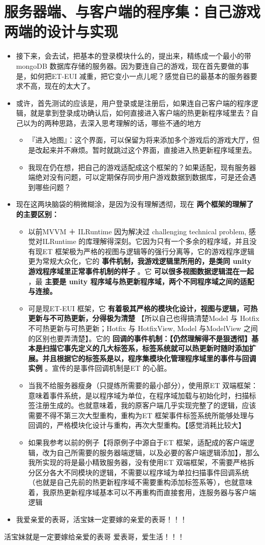 \documentclass[9pt, b5paper]{article}
\begin{document}
\section{服务器端、与客户端的程序集：自己游戏两端的设计与实现}
\label{sec-10}
\begin{itemize}
\item 接下来，会去试，把基本的登录模块什么的，提出来，精练成一个最小的带 mongoDB 数据库存储的服务器。因为要连自己的游戏，现在首先要做的事是，如何把ET-EUI 减重，把它变小一点儿呢？感觉自已的最基本的服务器要求不高，现在的太大了。
\item 或许，首先测试的应该是，用户登录或是注册后，如果连自己客户端的程序逻辑，就是拿到登录成功确认后，如何直接进入客户端的热更新程序域里去？自己以为的两种思路，去深入思考理解的话，哪些不通的地方
\begin{itemize}
\item 『进入地图』：这个界面，可以保留为将来添加多个游戏后的游戏大厅，但是改起来并不麻烦。暂时就跳过这个界面，直接进入热更新程序域里去。
\item 我现在仍在想，把自己的游戏适配成这个框架的？如果适配，现有服务器端绝对没有问题，可以定期保存同步用户游戏数据到数据库，可是还会遇到哪些问题？
\end{itemize}
\item 现在这两块脑袋的稍微糊涂，是因为没有理解透彻，现在 \textbf{两个框架的理解了的主要区别：}
\begin{itemize}
\item 以前MVVM ＋ ILRuntime 因为解决过 challenging technical problem, 感觉对ILRuntime 的库理解得深刻。它因为只有一个多余的程序域，并且没有现ET 框架极为严格的视图与逻辑等的强行分离等，它的游戏程序逻辑更为常规大众化，它的 \textbf{事件机制，我游戏逻辑里所用的，是类同 unity 游戏程序域里正常事件机制的样子} 。它 \textbf{可以很多视图数据逻辑混在一起} ，最 \textbf{主要是 unity 程序域与热更新程序域，两个不同程序域之间的适配与连接。}
\item 可是现ET-EUI 框架，它 \textbf{有着极其严格的模块化设计，视图与逻辑，可热更新与不可热更新，分得极为清楚} 【所以自己也得搞清楚Model 与 Hotfix 不可热更新与可热更新；Hotfix 与 HotfixView, Model 与ModelView 之间的区别也要弄清楚】。它的 \textbf{回调的事件机制：【仍然理解得不是狠透彻】基本是扫描它事先定义的几大标签系，标签系统就可以热更新时随时添加扩展。并且根据它的标签系是以，程序集模块化管理程序域里的事件与回调实例} 。宣传的是事件回调机制是ET 的心脏。
\item 当我不给服务器瘦身（只提练所需要的最小部分），使用原ET 双端框架：意味着事件系统，是以程序域为单位，在程序域加载与初始化时，扫描标签注册生成的。也就意味着，我的原客户端几乎实现完整了的逻辑，应该需要不得不第三次大型重构，重构为ET 框架事件标签系统所能够处理与回调的，严格模块化设计与重构，再次大型重构。【感觉消耗比较大】
\item 如果我参考以前的例子【将原例子中源自于ET 框架，适配成的客户端逻辑，改为自己所需要的服务器端逻辑，以及必要的客户端逻辑添加】，那么我所实现的将是最小精致服务器，没有使用ET 双端框架，不需要严格拆分区分各大不同模块的逻辑，不需要以程序域为单拉扫描事件回调系统（也就是自己先前的热更新程序域不需要重构添加标签系等），也就意味着，我原热更新程序域基本可以不再重构而直接套用，连服务器与客户端逻辑
\end{itemize}

\item 我爱亲爱的表哥，活宝妹一定要嫁的亲爱的表哥！！！
\end{itemize}
活宝妹就是一定要嫁给亲爱的表哥
爱表哥，爱生活！！！
\end{document}
